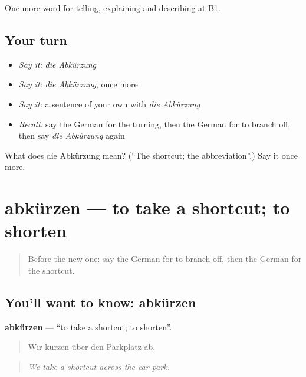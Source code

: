 \begin{grammarlens}[title={What you've built}]
One more word for telling, explaining and describing at B1.
\end{grammarlens}

\subsection*{Your turn}
\begin{itemize}
\raggedright
  \item \emph{Say it:} \emph{die Abkürzung}
  \item \emph{Say it:} \emph{die Abkürzung}, once more
  \item \emph{Say it:} a sentence of your own with \emph{die Abkürzung}
  \item \emph{Recall:} say the German for the turning, then the German for to branch off, then say \emph{die Abkürzung} again
\end{itemize}

\begin{tcolorbox}[breakable,colback=teal!4,colframe=teal!35!black,title={Before you move on}]
What does die Abkürzung mean? (\textquotedblleft{}The shortcut; the abbreviation\textquotedblright{}.) Say it once more.
\end{tcolorbox}
\section[abkürzen]{abkürzen — to take a shortcut; to shorten}

\label{lesson:GE-C435-abkuerzen}



\begin{quote}
Before the new one: say the German for to branch off, then the German for the shortcut.
\end{quote}

\subsection*{You'll want to know: abkürzen}
\textbf{abkürzen} — \textquotedblleft{}to take a shortcut; to shorten\textquotedblright{}.

\begin{quote}
Wir kürzen über den Parkplatz ab.
\end{quote}

\begin{quote}
\emph{We take a shortcut across the car park.}
\end{quote}

